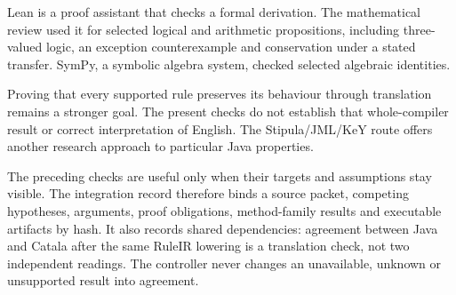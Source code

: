 \documentclass[12pt,a4paper,oneside,openany]{book}
\begin{document}
Lean is a proof assistant that checks a formal derivation. The mathematical
review used it for selected logical and arithmetic propositions, including
three-valued logic, an exception counterexample and conservation under a stated
transfer. SymPy, a symbolic algebra system, checked selected algebraic identities.

\begin{MapDiagram}
\end{MapDiagram}

Proving that every supported rule preserves its behaviour through translation
remains a stronger goal. The present checks do not establish that whole-compiler
result or correct interpretation of English. The Stipula/JML/KeY route offers
another research approach to particular Java properties.

\clearpage
{}
The preceding checks are useful only when their targets and assumptions stay
visible. The integration record therefore binds a source packet, competing
hypotheses, arguments, proof obligations, method-family results and executable
artifacts by hash. It also records shared dependencies: agreement between Java
and Catala after the same RuleIR lowering is a translation check, not two
independent readings. The controller never changes an unavailable, unknown or
unsupported result into agreement.
\end{document}

